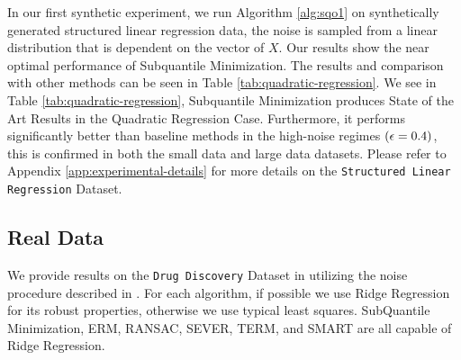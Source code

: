 \documentclass{article} %
\begin{document}
	In our first synthetic experiment, we run Algorithm \ref{alg:sqo1} on synthetically generated structured linear regression data, the noise is sampled from a linear distribution that is dependent on the vector of $X$. Our results show the near optimal performance of Subquantile Minimization. The results and comparison with other methods can be seen in Table \ref{tab:quadratic-regression}. We see in Table \ref{tab:quadratic-regression}, Subquantile Minimization produces State of the Art Results in the Quadratic Regression Case. Furthermore, it performs significantly better than baseline methods in the high-noise regimes $({\epsilon} = 0.4)$, this is confirmed in both the small data and large data datasets. Please refer to Appendix \ref{app:experimental-details} for more details on the \texttt{Structured Linear Regression} Dataset. 

	\subsection{Real Data}
	
	We provide results on the \texttt{Drug Discovery} Dataset in \cite{DiakonikolasKKLSS19} utilizing the noise procedure described in \cite{li2020tilted}. For each algorithm, if possible we use Ridge Regression for its robust properties, otherwise we use typical least squares. SubQuantile Minimization, ERM, RANSAC, SEVER, TERM, and SMART are all capable of Ridge Regression. 
	
\end{document}
